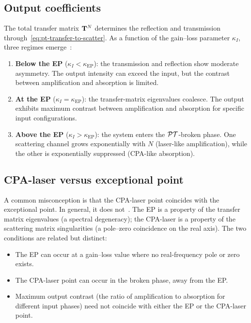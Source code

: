 \subsection{Output coefficients}
\label{ssec:output-coefficients}

The total transfer matrix $\mathbf{T}^N$ determines the reflection and
transmission through~\eqref{eq:pt-transfer-to-scatter}. As a function of
the gain--loss parameter $\kappa_I$, three regimes
emerge~\cite{novitsky2019cpa}:
\begin{enumerate}
 \item \textbf{Below the EP} ($\kappa_I < \kappa_{\mathrm{EP}}$):
 the transmission and reflection show moderate asymmetry. The output
 intensity can exceed the input, but the contrast between amplification
 and absorption is limited.
 \item \textbf{At the EP} ($\kappa_I = \kappa_{\mathrm{EP}}$):
 the transfer-matrix eigenvalues coalesce. The output exhibits maximum
 contrast between amplification and absorption for specific input
 configurations.
 \item \textbf{Above the EP} ($\kappa_I > \kappa_{\mathrm{EP}}$):
 the system enters the $\mathcal{PT}$-broken phase. One scattering channel
 grows exponentially with $N$ (laser-like amplification), while the
 other is exponentially suppressed (CPA-like absorption).
\end{enumerate}

\subsection{CPA-laser versus exceptional point}
\label{ssec:cpa-vs-ep}

A common misconception is that the CPA-laser point coincides with the
exceptional point. In general, it does not~\cite{novitsky2019cpa}.
The EP is a property of the transfer matrix eigenvalues (a spectral
degeneracy); the CPA-laser is a property of the scattering matrix
singularities (a pole--zero coincidence on the real axis). The two
conditions are related but distinct:
\begin{itemize}
 \item The EP can occur at a gain--loss value where no real-frequency
 pole or zero exists.
 \item The CPA-laser point can occur in the broken phase, away from
 the EP.
 \item Maximum output contrast (the ratio of amplification to
 absorption for different input phases) need not coincide with
 either the EP or the CPA-laser point.
\end{itemize}

